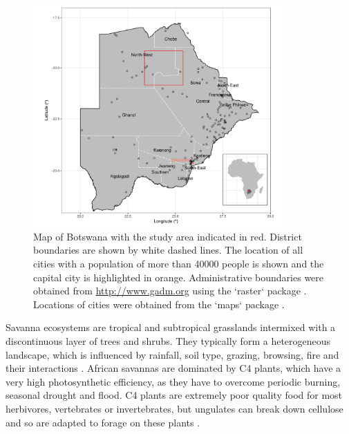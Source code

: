 \documentclass[12pt,a4paper, twoside, english]{article}
\begin{document}
\begin{figure}[H]
  \centering
  \includegraphics[width=0.85\textwidth]{figures/Studyarea_BWA.png} %
  \caption[Map of Botswana]{Map of Botswana with the study area indicated in red. District boundaries are shown by white dashed lines. The location of all cities with a population of more than 40000 people is shown and the capital city is highlighted in orange. Administrative boundaries were obtained from \url{http://www.gadm.org} using the `raster` package \citep{Bivand2016a}. Locations of cities were obtained from the `maps` package \citep{Becker2016}.
}
  \label{fig:studyarea_bwa}
\end{figure}

Savanna ecosystems are tropical and subtropical grasslands intermixed with a discontinuous layer of trees and shrubs. They typically form a heterogeneous landscape, which is influenced by rainfall, soil type, grazing, browsing, fire and their interactions \citep{DeKnegt2008, Shorrocks2014}. African savannas are dominated by C4 plants, which have a very high photosynthetic efficiency, as they have to overcome periodic burning, seasonal drought and flood. C4 plants are extremely poor quality food for most herbivores, vertebrates or invertebrates, but ungulates can break down cellulose and so are adapted to forage on these plants \citep{Shorrocks2014}.
\end{document}
